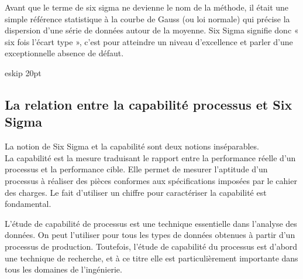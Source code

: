 \documentclass[12pt, a4paper]{thesis}
\begin{document}
Avant que le terme de six sigma ne devienne le nom de la méthode, il était une simple référence statistique à la courbe de Gauss (ou loi normale) qui précise la dispersion d’une série de données autour de la moyenne. Six Sigma signifie donc « six fois l’écart type », c’est pour atteindre un niveau d'excellence et parler d’une exceptionnelle absence de défaut.
\begin{table}[!htbp]
\begin{center}
\baselin eskip 20pt
 \caption{Les niveaux 6 Sigma}
 \end{center}
\end{table}


\subsection{La relation entre la capabilité processus et Six Sigma}


La notion de Six Sigma et la capabilité sont deux notions inséparables. \\
La capabilité est la mesure traduisant le rapport entre la performance réelle d'un processus et la performance cible. Elle permet de mesurer l'aptitude d'un processus à réaliser des pièces conformes aux spécifications imposées par le cahier des charges. Le fait d'utiliser un chiffre pour caractériser la capabilité est fondamental.

L'étude de capabilité de processus est une technique essentielle dans l'analyse des données. On peut l'utiliser pour tous les types de données obtenues à partir d'un processus de production. Toutefois, l'étude de capabilité du processus est d'abord une technique de recherche, et à ce titre elle est particulièrement importante dans tous les domaines de l'ingénierie.
\end{document}
